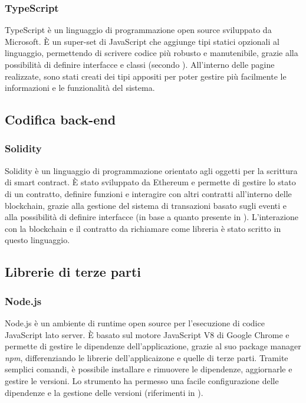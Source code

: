 \subsubsection{TypeScript}
TypeScript è un linguaggio di programmazione open source sviluppato da Microsoft. È un super-set di JavaScript che aggiunge tipi statici opzionali al linguaggio,
permettendo di scrivere codice più robusto e manutenibile, grazie alla possibilità di definire interfacce e classi (secondo \cite{site:react}).
All'interno delle pagine realizzate, sono stati creati dei tipi appositi per poter gestire più facilmente le informazioni e le funzionalità del sistema.

\subsection{Codifica back-end}

\subsubsection{Solidity}
Solidity è un linguaggio di programmazione orientato agli oggetti per la scrittura di smart contract. È stato sviluppato da Ethereum e permette di gestire
lo stato di un contratto, definire funzioni e interagire con altri contratti all'interno delle blockchain,
grazie alla gestione del sistema di transazioni basato sugli eventi e alla possibilità di definire interfacce (in base a quanto presente in \cite{site:solidity}).
L'interazione con la blockchain e il contratto da richiamare come libreria è stato scritto in questo linguaggio.

\subsection{Librerie di terze parti}

\subsubsection{Node.js}
Node.js è un ambiente di runtime open source per l'esecuzione di codice JavaScript lato server. È basato sul motore JavaScript V8 di Google Chrome e permette di gestire
le dipendenze dell'applicazione, grazie al suo package manager \textit{npm}, differenziando le librerie dell'applicaizone e quelle di terze parti.
Tramite semplici comandi, è possibile installare e rimuovere le dipendenze, aggiornarle e gestire le versioni. 
Lo strumento ha permesso una facile configurazione delle dipendenze e la gestione delle versioni (riferimenti in \cite{site:node}).

